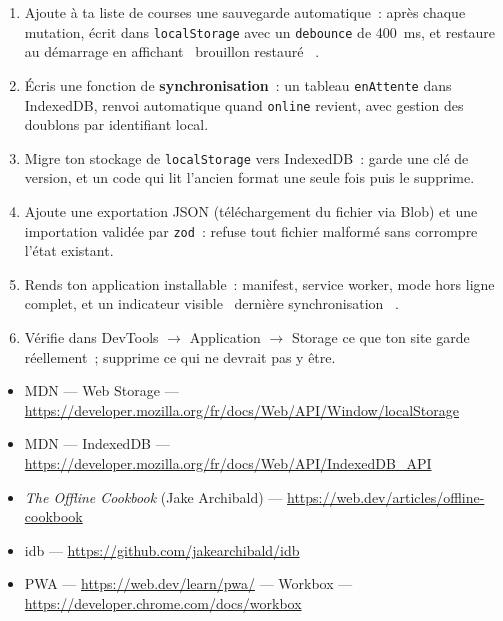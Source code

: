 \begin{exercice}
\begin{enumerate}
  \item Ajoute \`a ta liste de courses une sauvegarde automatique~: apr\`es chaque mutation,
        \'ecrit dans \verb|localStorage| avec un \verb|debounce| de 400~ms, et restaure au
        d\'emarrage en affichant \og ~brouillon restaur\'e~ \fg{}.
  \item \'Ecris une fonction de \textbf{synchronisation}~: un tableau \verb|enAttente| dans
        IndexedDB, renvoi automatique quand \verb|online| revient, avec gestion des doublons
        par identifiant local.
  \item Migre ton stockage de \verb|localStorage| vers IndexedDB~: garde une cl\'e de version,
        et un code qui lit l'ancien format une seule fois puis le supprime.
  \item Ajoute une exportation JSON (t\'el\'echargement du fichier via Blob) et une importation
        valid\'ee par \verb|zod|~: refuse tout fichier malform\'e sans corrompre l'\'etat existant.
    \item Rends ton application installable~: manifest, service worker, mode hors ligne
        complet, et un indicateur visible \og ~derni\`ere synchronisation~ \fg{}.
  \item V\'erifie dans DevTools $\rightarrow$ Application $\rightarrow$ Storage ce que ton site
        garde r\'eellement~; supprime ce qui ne devrait pas y \^etre.
\end{enumerate}
\end{exercice}

\begin{ressources}
\begin{itemize}
  \item MDN --- Web Storage --- \url{https://developer.mozilla.org/fr/docs/Web/API/Window/localStorage}
  \item MDN --- IndexedDB --- \url{https://developer.mozilla.org/fr/docs/Web/API/IndexedDB_API}
  \item \emph{The Offline Cookbook} (Jake Archibald) --- \url{https://web.dev/articles/offline-cookbook}
  \item idb --- \url{https://github.com/jakearchibald/idb}
  \item PWA --- \url{https://web.dev/learn/pwa/} --- Workbox --- \url{https://developer.chrome.com/docs/workbox}
\end{itemize}
\end{ressources}

